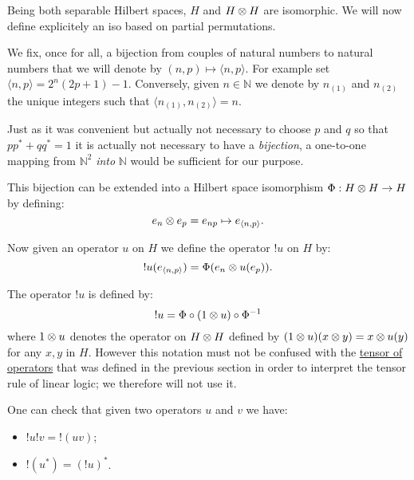 Being both separable Hilbert spaces, \(H\) and \(H\otimes H\) are
isomorphic. We will now define explicitely an iso based on partial
permutations.

We fix, once for all, a bijection from couples of natural numbers to
natural numbers that we will denote by
\((n,p)\mapsto\langle n,p\rangle\). For example set
\(\langle n,p\rangle = 2^n(2p+1) - 1\). Conversely, given
\(n\in\mathbb{N}\) we denote by \(n_{(1)}\) and \(n_{(2)}\) the unique
integers such that \(\langle n_{(1)},
n_{(2)}\rangle = n\).

\begin{remark}
Just as it was convenient but actually not necessary to choose $p$ and $q$ so that $pp^* + qq^* = 1$ it is actually not necessary to have a \emph{bijection}, a one-to-one mapping from $\mathbb{N}^2$ \emph{into} $\mathbb{N}$ would be sufficient for our purpose.
\end{remark}

This bijection can be extended into a Hilbert space isomorphism
\(\Phi:H\otimes H\rightarrow H\) by defining:
\begin{equation*}
e_n\otimes e_p = e_{np} \mapsto e_{\langle n,p\rangle}.
\end{equation*}

Now given an operator \(u\) on \(H\) we define the operator \(!u\) on
\(H\) by:
\begin{equation*}
!u(e_{\langle n,p\rangle}) = \Phi(e_n\otimes u(e_p)).
\end{equation*}

\begin{remark}
The operator $!u$ is defined by:
\begin{equation*}
!u = \Phi\circ (1\otimes u)\circ \Phi^{-1}
\end{equation*}
where $1\otimes u$ denotes the operator on $H\otimes H$ defined by $(1\otimes u)(x\otimes y) = x\otimes u(y)$ for any $x,y$ in $H$. However this notation must not be confused with the \hyperref[the-tensor-rule]{tensor of operators} that was defined in the previous section in order to interpret the tensor rule of linear logic; we therefore will not use it.
\end{remark}

One can check that given two operators \(u\) and \(v\) we have:
\begin{itemize}
\item \(!u!v = {!(uv)}\);
\item \(!(u^*) = (!u)^*\).
\end{itemize}

